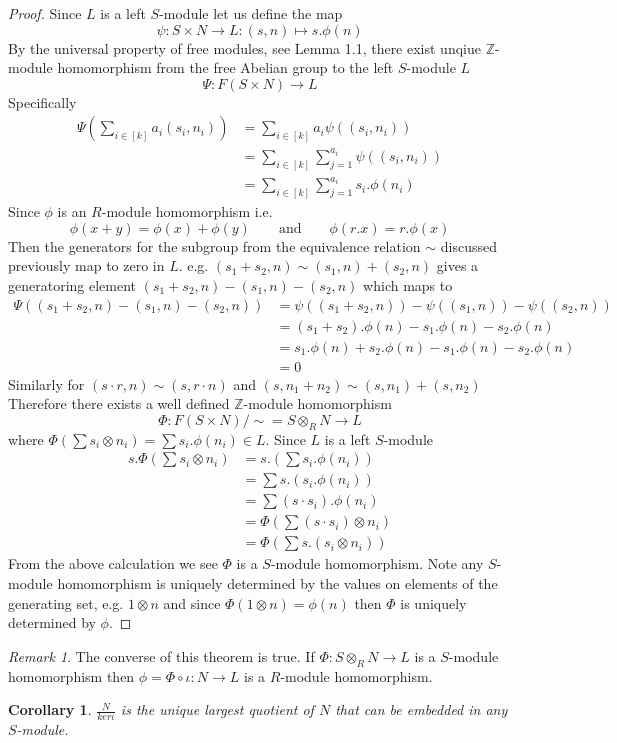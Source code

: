 \documentclass{article}
\theoremstyle{plain}
\newtheorem{cor}{Corollary}[section]
\theoremstyle{definition}
\theoremstyle{remark}
\newtheorem{remark}{Remark}[section]
\begin{document}
  \begin{proof}
    Since $L$ is a left $S$-module let us define the map 
    \[\psi:S\times N\to L:(s,n)\mapsto s.\phi(n)\]  
    By the universal property of free modules, see Lemma 1.1, there exist 
    unqiue $\mathbb{Z}$-module homomorphism from the free Abelian group to the
    left $S$-module $L$ 
    \[  \Psi:F(S\times N)\to L \]
    Specifically
    \begin{align*}
      \Psi\left( \sum_{i\in[k]}a_i(s_i,n_i) \right)
      &= \sum_{i\in[k]}a_i\psi((s_i,n_i)) \\
      &= \sum_{i\in[k]}\sum_{j=1}^{a_i}\psi((s_i,n_i))\\
      &= \sum_{i\in[k]}\sum_{j=1}^{a_i}s_i.\phi(n_i)
    \end{align*}
    Since $\phi$ is an $R$-module homomorphism i.e.
    \[\phi(x+y)=\phi(x)+\phi(y)\qquad\text{and}\qquad\phi(r.x)=r.\phi(x)\]
    Then the generators for the subgroup from the equivalence relation $\sim$ discussed
    previously map to zero in $L$.
    e.g. $(s_1+s_2,n)\sim(s_1,n)+(s_2,n)$ gives a generatoring element
    $(s_1+s_2,n)-(s_1,n)-(s_2,n)$ which maps to
    \begin{align*}
      \Psi((s_1+s_2,n)-(s_1,n)-(s_2,n))
      &=\psi((s_1+s_2,n))-\psi((s_1,n))-\psi((s_2,n))\\
      &=(s_1+s_2).\phi(n)-s_1.\phi(n)-s_2.\phi(n)\\
      &=s_1.\phi(n)+s_2.\phi(n)-s_1.\phi(n)-s_2.\phi(n)\\
      &=0
    \end{align*}
    Similarly for $(s\cdot r,n)\sim(s,r\cdot n)$ and $(s,n_1+n_2)\sim(s,n_1)+(s,n_2)$
    Therefore there exists a well defined $\mathbb{Z}$-module homomorphism
    \[ \Phi:F(S\times N)/\sim=S\otimes_RN\to L \]
    where $\Phi(\sum s_i\otimes n_i)=\sum s_i.\phi(n_i)\in L$. Since $L$ is a left
    $S$-module
    \begin{align*}
      s.\Phi\left(\sum s_i\otimes n_i\right) &= s.\left(\sum s_i.\phi(n_i)\right) \\
      &= \sum s.(s_i.\phi(n_i)) \\
      &= \sum (s\cdot s_i).\phi(n_i) \\
      &= \Phi\left(\sum(s\cdot s_i)\otimes n_i\right)\\
      &= \Phi\left(\sum s.(s_i\otimes n_i)\right)
    \end{align*}
    From the above calculation we see $\Phi$ is a $S$-module homomorphism.
    Note any $S$-module homomorphism is uniquely determined by the values on
    elements of the generating set, e.g. $1\otimes n$ and since 
    $\Phi(1\otimes n)=\phi(n)$ then $\Phi$ is uniquely determined by $\phi$.
  \end{proof}
  \begin{remark}
    The converse of this theorem is true. If $\Phi:S\otimes_RN\to L$ is a 
    $S$-module homomorphism then $\phi=\Phi\circ\iota:N\to L$ is a
    $R$-module homomorphism.
  \end{remark}
  \begin{cor}
    $\frac{N}{ker\iota}$ is the unique largest quotient of $N$ that can be 
    embedded in any $S$-module.
  \end{cor}
\end{document}
